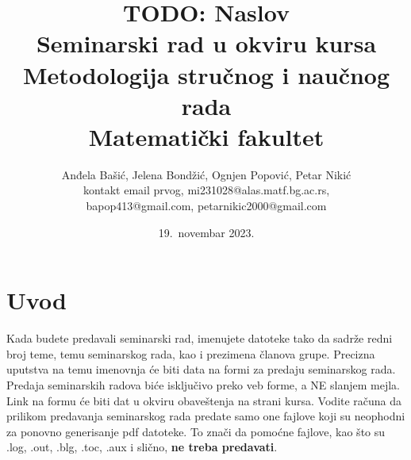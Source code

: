 \documentclass[a4paper]{article}
\begin{document}
\title{TODO: Naslov\\ \small{Seminarski rad u okviru kursa\\Metodologija stručnog i naučnog rada\\ Matematički fakultet}}

\author{Anđela Bašić, Jelena Bondžić, Ognjen Popović, Petar Nikić\\ \small{kontakt email prvog, mi231028@alas.matf.bg.ac.rs},\\ \small{bapop413@gmail.com, petarnikic2000@gmail.com}}

\date{19.~novembar 2023.}

\maketitle


\tableofcontents

\newpage

\section{Uvod}
\label{sec:uvod}

Kada budete predavali seminarski rad, imenujete datoteke tako da sadrže redni broj teme, temu seminarskog rada, kao i prezimena članova grupe. Precizna uputstva na temu imenovnja će biti data na formi za predaju seminarskog rada. Predaja seminarskih radova biće isključivo preko veb forme, a NE slanjem mejla. Link na formu će biti dat u okviru obaveštenja na strani kursa. Vodite računa da prilikom predavanja seminarskog rada predate samo one fajlove koji su neophodni za ponovno generisanje pdf datoteke. To znači da pomoćne fajlove, kao što su .log, .out, .blg, .toc, .aux i slično, \textbf{ne treba predavati}.
\end{document}
